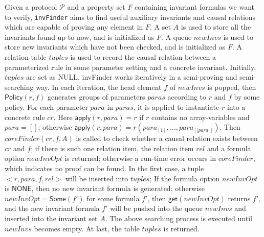 \documentclass[conference]{IEEEtran}
\begin{document}
{\begin{algorithm}
\end{algorithm}
\vspace{-15pt}
Given a protocol $\mathcal{P}$ and a property set $F$ containing invariant formulas we want to verify, {\tt invFinder} aims to find useful auxiliary invariants and causal relations which are capable of proving any element in $F$.  A set $A$ is used to store all the invariants found up to now, and is initialized as  $F$. A queue  $newInvs$ is used to store new invariants which have not been checked,  and  is initialized as  $F$.  A relation table $tuples$ is used to record the causal relation between a parameterized rule in some parameter setting and a concrete invariant. Initially,  $tuples$ are set as NULL.
{\sf invFinder}  works iteratively in a semi-proving and semi-searching way. In each iteration, the head element $f$ of $newInvs$ is popped,  then $\mathsf{Policy}(r,f)$  generates groups of parameters $paras$  according to $r$ and $f$ by some policy. For each parameter $para$ in $paras$,   it is applied to instantiate $r$ into a concrete rule $cr$.  Here  $\mathsf{apply}(r,para)=r$ if $r$ contains no array-variables and $para=[]$; otherwise $\mathsf{apply}(r,para)=r(para_{[1]},..., para_{[|para|]})$. Then $coreFinder(cr,  f, A)$ is called to check
 whether  a causal relation exists between $cr$ and $f$; if there is such one relation item, the relation item $rel$ and a  formula option $newInvOpt$ is returned; otherwise a run-time error occurs in  $coreFinder$, which indicates no proof can be found. In the first case, a tuple $<r, para, f, rel>$ will be inserted into $tuples$; If the formula option $newInvOpt$ is $\mathsf{NONE}$, then no new invariant formula is generated; otherwise $newInvOpt=\mathsf{Some}(f')$ for some formula $f'$, then  $\mathsf{get}(newInvOpt)$ returns $f'$, and the new invariant formula $f'$ will be pushed into the queue $newInvs$ and inserted into the invariant set $A$.  The above searching process is executed until $newInvs$ becomes empty.  At last, the table $tuples$ is returned.


}
\end{document}
